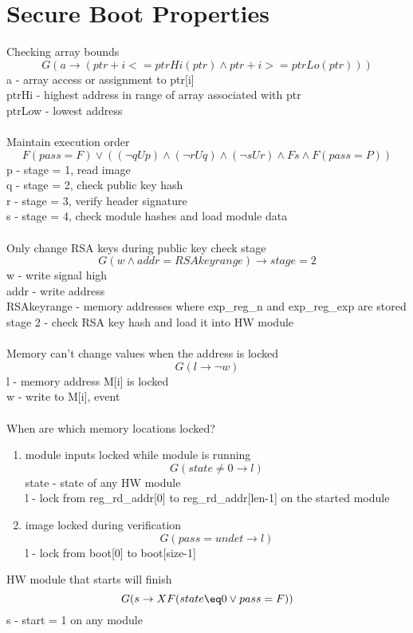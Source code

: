 \documentclass[10pt,openany]{article}
\author{Elaine Chou}
\begin{document}
\section{Secure Boot Properties}
Checking array bounds
\[G(a\rightarrow(ptr+i <= ptrHi(ptr) \land ptr+i >= ptrLo(ptr)))\]
a - array access or assignment to ptr[i]\\
ptrHi - highest address in range of array associated with ptr\\
ptrLow - lowest address\\\\
%
Maintain execution order
\[F(pass=F)\lor((\lnot qUp)\land(\lnot rUq)\land(\lnot sUr)\land Fs\land F(pass=P))\]
p - stage = 1, read image\\
q - stage = 2, check public key hash\\
r - stage = 3, verify header signature\\
s - stage = 4, check module hashes and load module data\\\\
%
Only change RSA keys during public key check stage
\[G(w\land addr=RSAkeyrange)\rightarrow stage=2\]
w - write signal high\\
addr - write address\\
RSAkeyrange - memory addresses where exp\_reg\_n and exp\_reg\_exp are stored\\
stage 2 - check RSA key hash and load it into HW module\\\\
%
Memory can't change values when the address is locked
\[G(l\rightarrow\lnot w)\]
l - memory address M[i] is locked\\
w - write to M[i], event\\\\
%
When are which memory locations locked?
\begin{enumerate}
\item module inputs locked while module is running\\
  \[G(state\neq 0\rightarrow l)\]
  state - state of any HW module\\
  l - lock from reg\_rd\_addr[0] to reg\_rd\_addr[len-1] on the started module\\
\item image locked during verification
  \[G(pass=undet\rightarrow l)\]
  l - lock from boot[0] to boot[size-1]
\end{enumerate}
%
HW module that starts will finish
\[G(s\rightarrow XF(state\eq 0\lor pass=F))\]
s - start = 1 on any module\\
\end{document}
